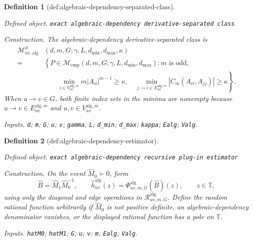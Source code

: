 \documentclass{article}
\newtheorem{definition}{Definition}
\begin{document}
\begin{definition}[def:algebraic-dependency-separated-class]\label{def:algebraic-dependency-separated-class}
\par\smallskip\noindent\emph{Defined object.} \texttt{exact algebraic-\allowbreak{}dependency derivative-\allowbreak{}separated class}
\par\smallskip\noindent\emph{Construction.} The algebraic-dependency derivative-separated class is
\[
\begin{split}
 \mathcal M_{uv,\mathrm{alg}}^{\partial}
 &(d,m,G;\gamma,L,d_{\min},d_{\max},\kappa)\\
 ={}&\left\{P\in\mathcal M_{\mathrm{cmp}}(d,m,G;\gamma,L,d_{\min},d_{\max}):
 m\text{ is odd},\right.\\
 &\left.\qquad
 \min_{i\in V_{uv}^{\mathrm{alg},m}}m|A_{ii}|^{m-1}\ge\kappa,
 \quad
 \min_{j\to i\in E_{uv}^{\mathrm{alg},m}}|C_m(A_{ii},A_{jj})|\ge\kappa
 \right\}.
\end{split}
\]
When \(u\to v\in G\), both finite index sets in the minima are nonempty because \(u\to v\in E_{uv}^{\mathrm{alg},m}\) and \(u,v\in V_{uv}^{\mathrm{alg},m}\).
\par\smallskip\noindent\emph{Inputs.} \texttt{d}; \texttt{m}; \texttt{G}; \texttt{u}; \texttt{v}; \texttt{gamma}; \texttt{L}; \texttt{d\_\allowbreak{}min}; \texttt{d\_\allowbreak{}max}; \texttt{kappa}; \texttt{Ealg}; \texttt{Valg}.
\end{definition}

\begin{definition}[def:algebraic-dependency-estimator]\label{def:algebraic-dependency-estimator}
\par\smallskip\noindent\emph{Defined object.} \texttt{exact algebraic-\allowbreak{}dependency recursive plug-\allowbreak{}in estimator}
\par\smallskip\noindent\emph{Construction.} On the event \(\widehat M_0\succ0\), form
\[
 \widehat B=\widehat M_1\widehat M_0^{-1},
 \qquad
 \widehat h_{uv}^{\mathrm{alg}}(z)
 =\Phi^{\mathrm{alg}}_{uv,m,G}(\widehat B)(z),
 \qquad z\in\mathbb T,
\]
using only the diagonal and edge operations in \(\mathscr R^{\mathrm{alg}}_{uv,m,G}\).  Define the random rational function arbitrarily if \(\widehat M_0\) is not positive definite, an algebraic-dependency denominator vanishes, or the displayed rational function has a pole on \(\mathbb T\).
\par\smallskip\noindent\emph{Inputs.} \texttt{hatM0}; \texttt{hatM1}; \texttt{G}; \texttt{u}; \texttt{v}; \texttt{m}; \texttt{Ealg}; \texttt{Valg}.
\end{definition}
\end{document}
